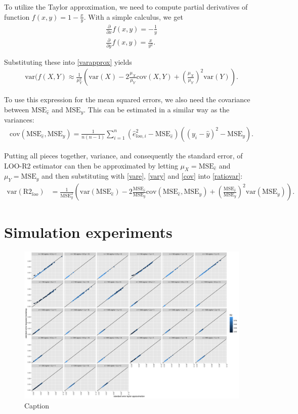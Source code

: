 \documentclass{article}
\begin{document}
To utilize the Taylor approximation, we need to compute partial derivatives of function $f(x,y) = 1 - \frac{x}{y}$. With a simple calculus, we get
\begin{align}
    \frac{\partial}{\partial x}f(x,y) = -\frac{1}{y} \\
    \frac{\partial}{\partial y}f(x,y) = \frac{x}{y^2}.
\end{align}

Substituting these into \eqref{varapprox} yields
\begin{align}
    \text{var}(f(X, Y) \approx \frac{1}{\mu_Y^2} \left( \text{var}(X) - 2 \frac{\mu_X}{\mu_Y} \text{cov}(X,Y) + \left( \frac{\mu_X}{\mu_Y} \right)^2 \text{var}(Y) \right) \label{ratiovar}.
\end{align}

 To use this expression for the mean squared errors, we also need the covariance between $\text{MSE}_{\hat{e}}$ and $\text{MSE}_y$. This can be estimated in a similar way as the variances:
 \begin{align}
     \text{cov}(\text{MSE}_{\hat{e}}, \text{MSE}_{y} ) = \frac{1}{n (n -1 )} \sum_{i = 1}^n \left( \hat{e}_{loo, i}^2 - \text{MSE}_{\hat{e}} \right) \left( (y_i - \hat{y})^2 -\text{MSE}_y \right) \label{cov}.
 \end{align}
 
 Putting all pieces together, variance, and consequently the standard error, of LOO-R2 estimator can then be approximated by letting $\mu_X = \text{MSE}_{\hat{e}}$ and $\mu_Y = \text{MSE}_y$ and then substituting with \eqref{vare}, \eqref{vary} and \eqref{cov} into \eqref{ratiovar}:
 \begin{align}
     \text{var}(\text{R2}_{loo}) &= \frac{1}{\text{MSE}_y^2} \left( \text{var}(\text{MSE}_{\hat{e}}) - 2 \frac{\text{MSE}_{\hat{e}}}{\text{MSE}_y} \text{cov}(\text{MSE}_{\hat{e}}, \text{MSE}_{y} ) +  \left( \frac{\text{MSE}_{\hat{e}}}{\text{MSE}_y} \right)^2 \text{var}(\text{MSE}_y) \right) \label{estimator}.
 \end{align}
 
\section{Simulation experiments}
\begin{figure}
    \centering
    \includegraphics[width=\paperwidth, height=\textheight]{simres.png}
    \caption{Caption}
    \label{fig:my_label}
\end{figure}
\end{document}

